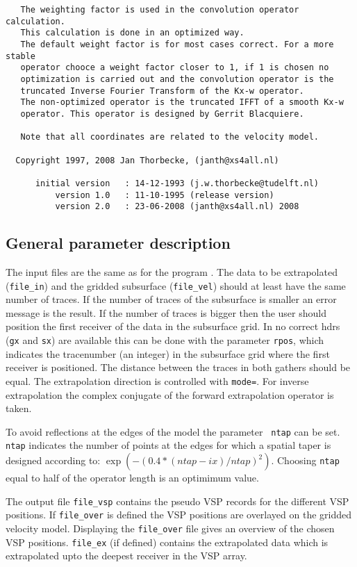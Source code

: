 {\begin{verbatim}
   The weighting factor is used in the convolution operator calculation.
   This calculation is done in an optimized way.
   The default weight factor is for most cases correct. For a more stable
   operator chooce a weight factor closer to 1, if 1 is chosen no 
   optimization is carried out and the convolution operator is the 
   truncated Inverse Fourier Transform of the Kx-w operator.
   The non-optimized operator is the truncated IFFT of a smooth Kx-w 
   operator. This operator is designed by Gerrit Blacquiere.
 
   Note that all coordinates are related to the velocity model.
 
  Copyright 1997, 2008 Jan Thorbecke, (janth@xs4all.nl) 
 
      initial version   : 14-12-1993 (j.w.thorbecke@tudelft.nl)
          version 1.0   : 11-10-1995 (release version)
          version 2.0   : 23-06-2008 (janth@xs4all.nl) 2008
\end{verbatim}}

\noindent

\subsection{General parameter description}

The input files are the same as for the program . The data to be extrapolated ({\tt file\_in}) and
the gridded subsurface ({\tt file\_vel}) should at least have the same
number of traces. If the number of traces of the subsurface is smaller
an error message is the result. If the number of traces is bigger then
the user should position the first receiver of the data in the
subsurface grid. In no correct hdrs ({\tt gx} and {\tt sx}) are
available this can be done with the parameter {\tt rpos}, which
indicates the tracenumber (an integer) in the subsurface grid where
the first receiver is positioned. The distance between the traces in
both gathers should be equal. The extrapolation direction is
controlled with {\tt mode=}. For inverse extrapolation the complex
conjugate of the forward extrapolation operator is taken.

To avoid reflections at the edges of the model the parameter {\tt
  ntap} can be set. {\tt ntap} indicates the number of points at the
edges for which a spatial taper is designed according to:
$\exp{(-(0.4*(ntap-ix)/ntap)^2)}$. Choosing {\tt ntap} equal to half
of the operator length is an optimimum value.

The output file {\tt file\_vsp} contains the pseudo VSP records for
the different VSP positions. If {\tt file\_over} is defined the VSP
positions are overlayed on the gridded velocity model. Displaying the
{\tt file\_over} file gives an overview of the chosen VSP positions.
{\tt file\_ex} (if defined) contains the extrapolated data which is
extrapolated upto the deepest receiver in the VSP array.


